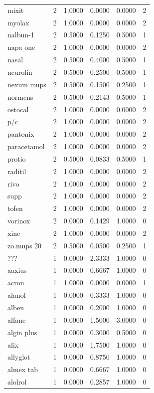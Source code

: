 \begin{longtable}{p{3.0cm}rrrrr}
mixit & 2 & 1.0000 & 0.0000 & 0.0000 & 2 \\
myolax & 2 & 1.0000 & 0.0000 & 0.0000 & 2 \\
nalbun-1 & 2 & 0.5000 & 0.1250 & 0.5000 & 1 \\
napa one & 2 & 1.0000 & 0.0000 & 0.0000 & 2 \\
nasal & 2 & 0.5000 & 0.4000 & 0.5000 & 1 \\
neurolin & 2 & 0.5000 & 0.2500 & 0.5000 & 1 \\
nexum mups & 2 & 0.5000 & 0.1500 & 0.2500 & 1 \\
normens & 2 & 0.5000 & 0.2143 & 0.5000 & 1 \\
ostocal & 2 & 1.0000 & 0.0000 & 0.0000 & 2 \\
p/c & 2 & 1.0000 & 0.0000 & 0.0000 & 2 \\
pantonix & 2 & 1.0000 & 0.0000 & 0.0000 & 2 \\
paracetamol & 2 & 1.0000 & 0.0000 & 0.0000 & 2 \\
protio & 2 & 0.5000 & 0.0833 & 0.5000 & 1 \\
raditil & 2 & 1.0000 & 0.0000 & 0.0000 & 2 \\
rivo & 2 & 1.0000 & 0.0000 & 0.0000 & 2 \\
supp & 2 & 1.0000 & 0.0000 & 0.0000 & 2 \\
tofen & 2 & 1.0000 & 0.0000 & 0.0000 & 2 \\
vorinox & 2 & 0.0000 & 0.1429 & 1.0000 & 0 \\
xinc & 2 & 1.0000 & 0.0000 & 0.0000 & 2 \\
zo.mups 20 & 2 & 0.5000 & 0.0500 & 0.2500 & 1 \\
??? & 1 & 0.0000 & 2.3333 & 1.0000 & 0 \\
aaxius & 1 & 0.0000 & 0.6667 & 1.0000 & 0 \\
acron & 1 & 1.0000 & 0.0000 & 0.0000 & 1 \\
alanol & 1 & 0.0000 & 0.3333 & 1.0000 & 0 \\
alben & 1 & 0.0000 & 0.2000 & 1.0000 & 0 \\
alfane & 1 & 0.0000 & 1.5000 & 3.0000 & 0 \\
algin plus & 1 & 0.0000 & 0.3000 & 0.5000 & 0 \\
alix & 1 & 0.0000 & 1.7500 & 1.0000 & 0 \\
allyglot & 1 & 0.0000 & 0.8750 & 1.0000 & 0 \\
almex tab & 1 & 0.0000 & 0.6667 & 1.0000 & 0 \\
alolrol & 1 & 0.0000 & 0.2857 & 1.0000 & 0 \\

\end{longtable}
